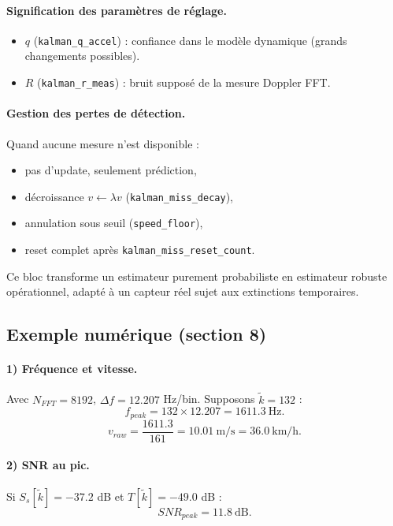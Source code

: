 \documentclass[a4paper,11pt]{article}
\begin{document}
\paragraph{Signification des param\`etres de r\'eglage.}
\begin{itemize}[leftmargin=2em]
  \item \(q\) (\texttt{kalman\_q\_accel}) : confiance dans le mod\`ele dynamique (grands changements possibles).
  \item \(R\) (\texttt{kalman\_r\_meas}) : bruit suppos\'e de la mesure Doppler FFT.
\end{itemize}

\paragraph{Gestion des pertes de d\'etection.}
Quand aucune mesure n'est disponible :
\begin{itemize}[leftmargin=2em]
  \item pas d'update, seulement pr\'ediction,
  \item d\'ecroissance \(v\leftarrow \lambda v\) (\texttt{kalman\_miss\_decay}),
  \item annulation sous seuil (\texttt{speed\_floor}),
  \item reset complet apr\`es \texttt{kalman\_miss\_reset\_count}.
\end{itemize}
Ce bloc transforme un estimateur purement probabiliste en estimateur robuste op\'erationnel, adapt\'e \`a un capteur r\'eel sujet aux extinctions temporaires.

\subsection{Exemple num\'erique (section 8)}

\paragraph{1) Fr\'equence et vitesse.}
Avec \(N_{FFT}=8192\), \(\Delta f=12.207\) Hz/bin.  
Supposons \(\tilde{k}=132\) :
\[
f_{peak}=132\times 12.207 = 1611.3\ \text{Hz}.
\]
\[
v_{raw}=\frac{1611.3}{161}=10.01\ \text{m/s}=36.0\ \text{km/h}.
\]

\paragraph{2) SNR au pic.}
Si \(S_s[\tilde{k}]=-37.2\) dB et \(T[\tilde{k}]=-49.0\) dB :
\[
SNR_{peak}=11.8\ \text{dB}.
\]
\end{document}
